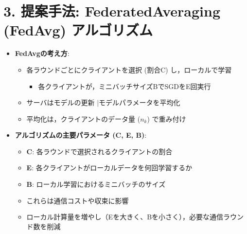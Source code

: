 \documentclass[unicode,12pt,aspectratio=169, dvipdfmx]{beamer}
\begin{document}
\section{3. 提案手法: FederatedAveraging (FedAvg) アルゴリズム}
\begin{frame}{\insertsectionhead}
\begin{itemize}
    \item \textbf{FedAvgの考え方}:
    \begin{itemize}
        \item 各ラウンドごとにクライアントを選択 (割合C) し，ローカルで学習
        \begin{itemize}
        \item 各クライアントが，ミニバッチサイズBでSGDをE回実行
        \end{itemize}
        \item サーバはモデルの更新 $|$モデルパラメータを平均化
        \item 平均化は，クライアントのデータ量 ($n_k$) で重み付け
    \end{itemize}
    \item \textbf{アルゴリズムの主要パラメータ (C, E, B)}:
    \begin{itemize}
        \item \textbf{C}: 各ラウンドで選択されるクライアントの割合 
        \item \textbf{E}: 各クライアントがローカルデータを何回学習するか
        \item \textbf{B}: ローカル学習におけるミニバッチのサイズ
        \item これらは通信コストや収束に影響
        \item ローカル計算量を増やし（Eを大きく、Bを小さく），必要な通信ラウンド数を削減
    \end{itemize}
\end{itemize}
\end{frame}
\end{document}
